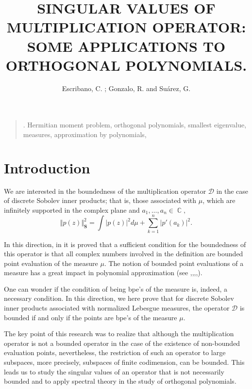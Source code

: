 \documentclass[12pt]{amsart}
\title{SINGULAR VALUES OF MULTIPLICATION OPERATOR: SOME APPLICATIONS TO ORTHOGONAL POLYNOMIALS.}
\author{Escribano, C. ; Gonzalo, R. and Suárez, G.}
\theoremstyle{definition}
\theoremstyle{plain}
\theoremstyle{remark}
\DeclareMathOperator{\CC}{\mathbb C}
\begin{document}
\begin{abstract}

\end{abstract}

\maketitle
\begin{quotation} {}. {\small Hermitian moment problem,  orthogonal polynomials,
smallest eigenvalue, measures, approximation by polynomials,}
\end{quotation}

\section{Introduction}
\noindent We are interested in the boundedness of the multiplication operator $\mathcal{D}$
in the case of   discrete Sobolev inner products; that is, those associated with $\mu$, which are infinitely supported  in the complex plane and 
$a_1,\dots ,a_n\in \CC, $ 
\begin{equation} \label{discrete}
\Vert p(z) \Vert^2_{\mathbf{S}}= \int \vert p(z) \vert^{2} d\mu + \sum_{k=1}^{n} \vert p'(a_k) \vert^{2}.
\end{equation}

\noindent In this direction, in \cite{EG2} it is  proved that a sufficient condition for the boundedness of this operator is that all complex numbers involved in the definition are bounded point evaluation of the measure $\mu$. The notion of bounded point evaluations of a measure has  a great impact in polynomial approximation (see ,,,,). 


\noindent One can wonder if the condition of being bpe's of the measure is, indeed, a necessary condition. In this direction, we here prove that for discrete Sobolev inner products associated with normalized Lebesgue measures, the operator $\mathcal{D}$ is bounded if and only if the points are bpe's of the measure $\mu$. 

\medskip
\noindent The key point of this research was to realize that although the multiplication operator is not a bounded operator in the case of the existence of non-bounded evaluation points,  nevertheless, the restriction of such an operator to large subspaces, more precisely, subspaces  of finite codimension, can be bounded. This leads us to  study the singular values of an operator that is not necessarily bounded and to apply spectral theory in the study of orthogonal polynomials. 
\end{document}
